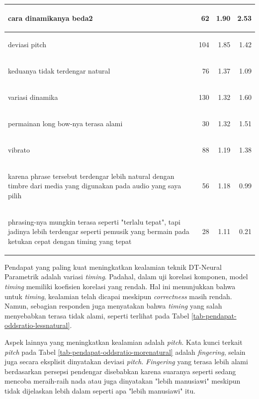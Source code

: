 \begin{table}[htbp]
\begin{center}
\begin{tabular}{|p{}|r|r|r|}
\begin{intabquote}cara dinamikanya beda2\end{intabquote}&	62&	1.90&	2.53\\\hline
\begin{intabquote}deviasi pitch\end{intabquote}&	104&	1.85&	1.42\\\hline
\begin{intabquote}keduanya tidak terdengar natural\end{intabquote}&	76&	1.37&	1.09\\\hline
\begin{intabquote}variasi dinamika\end{intabquote}&	130&	1.32&	1.60\\\hline
\begin{intabquote}permainan long bow-nya terasa alami\end{intabquote}&	30&	1.32&	1.51\\\hline
\begin{intabquote}vibrato\end{intabquote}&	88&	1.19&	1.38\\\hline
\begin{intabquote}karena phrase tersebut terdengar lebih natural dengan timbre dari media yang digunakan pada audio yang saya pilih\end{intabquote}&	56&	1.18&	0.99\\\hline
\begin{intabquote}phrasing-nya mungkin terasa seperti "terlalu tepat", tapi jadinya lebih terdengar seperti pemusik yang bermain pada ketukan cepat dengan timing yang tepat\end{intabquote}&	28&	1.11&	0.21\\\hline
\end{tabular}
  \end{center}
\end{table}

Pendapat yang paling kuat meningkatkan kealamian teknik DT-Neural Parametrik adalah variasi \textit{timing}. Padahal, dalam uji korelasi komponen, model \textit{timing} memiliki koefisien korelasi yang rendah. Hal ini menunjukkan bahwa untuk \textit{timing}, kealamian telah dicapai meskipun \textit{correctness} masih rendah. Namun, sebagian responden juga menyatakan bahwa \textit{timing} yang salah menyebabkan terasa tidak alami, seperti terlihat pada Tabel \ref{tab-pendapat-oddsratio-lessnatural}.

Aspek lainnya yang meningkatkan kealamian adalah \textit{pitch}. Kata kunci terkait \textit{pitch} pada Tabel \ref{tab-pendapat-oddsratio-morenatural} adalah \textit{fingering}, selain juga secara eksplisit dinyatakan deviasi \textit{pitch}. \textit{Fingering} yang terasa lebih alami berdasarkan persepsi pendengar disebabkan karena suaranya seperti sedang mencoba meraih-raih nada atau juga dinyatakan "lebih manusiawi" meskipun tidak dijelaskan lebih dalam seperti apa "lebih manusiawi" itu.

